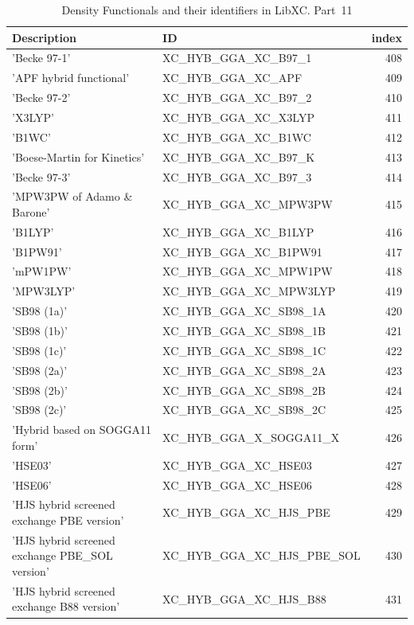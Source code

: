 \documentclass[final,12pt]{article}
\begin{document}
{{{{{{\begin{table}[!h]
\caption{Density Functionals and their identifiers in LibXC. Part~11}
\begin{center}
\begin{tabular}{llr}
\hline
\hline
Description & ID & index\\
\hline
  'Becke 97-1' & XC\_HYB\_GGA\_XC\_B97\_1  &408\\
  'APF hybrid functional' & XC\_HYB\_GGA\_XC\_APF  &409\\
  'Becke 97-2' & XC\_HYB\_GGA\_XC\_B97\_2  &410\\
  'X3LYP' & XC\_HYB\_GGA\_XC\_X3LYP  &411\\
  'B1WC' & XC\_HYB\_GGA\_XC\_B1WC  &412\\
  'Boese-Martin for Kinetics' & XC\_HYB\_GGA\_XC\_B97\_K  &413\\
  'Becke 97-3' & XC\_HYB\_GGA\_XC\_B97\_3  &414\\
  'MPW3PW of Adamo \& Barone' & XC\_HYB\_GGA\_XC\_MPW3PW  &415\\
  'B1LYP' & XC\_HYB\_GGA\_XC\_B1LYP  &416\\
  'B1PW91' & XC\_HYB\_GGA\_XC\_B1PW91  &417\\
  'mPW1PW' & XC\_HYB\_GGA\_XC\_MPW1PW  &418\\
  'MPW3LYP' & XC\_HYB\_GGA\_XC\_MPW3LYP  &419\\
  'SB98 (1a)' & XC\_HYB\_GGA\_XC\_SB98\_1A  &420\\
  'SB98 (1b)' & XC\_HYB\_GGA\_XC\_SB98\_1B  &421\\
  'SB98 (1c)' & XC\_HYB\_GGA\_XC\_SB98\_1C  &422\\
  'SB98 (2a)' & XC\_HYB\_GGA\_XC\_SB98\_2A  &423\\
  'SB98 (2b)' & XC\_HYB\_GGA\_XC\_SB98\_2B  &424\\
  'SB98 (2c)' & XC\_HYB\_GGA\_XC\_SB98\_2C  &425\\
  'Hybrid based on SOGGA11 form' & XC\_HYB\_GGA\_X\_SOGGA11\_X  &426\\
  'HSE03' & XC\_HYB\_GGA\_XC\_HSE03  &427\\
  'HSE06' & XC\_HYB\_GGA\_XC\_HSE06  &428\\
  'HJS hybrid screened exchange PBE version' & XC\_HYB\_GGA\_XC\_HJS\_PBE  &429\\
  'HJS hybrid screened exchange PBE\_SOL version' & XC\_HYB\_GGA\_XC\_HJS\_PBE\_SOL  &430\\
  'HJS hybrid screened exchange B88 version' & XC\_HYB\_GGA\_XC\_HJS\_B88  &431\\

\end{tabular}
\end{center}
\end{table}}}}}}}
\end{document}
